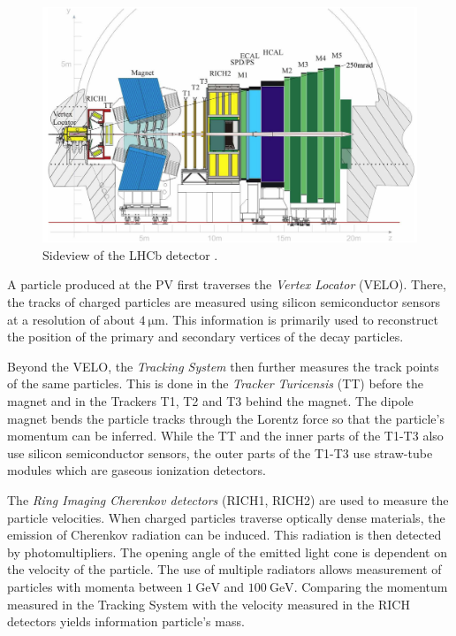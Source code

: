 \begin{figure}
    \centering
    \includegraphics[width=\textwidth]{images/lhcb_detector.png}
    \caption{Sideview of the LHCb detector \cite{LHCb}. }
    \label{fig:lhcb_detector}
\end{figure}

A particle produced at the PV first traverses the \emph{Vertex Locator} (VELO). 
There, the tracks of charged particles are measured using silicon semiconductor sensors at a resolution of about $\qty{4}{\micro\meter}$. 
This information is primarily used to reconstruct the position of the primary and secondary vertices of the decay particles.

Beyond the VELO, the \emph{Tracking System} then further measures the track points of the same particles. 
This is done in the \emph{Tracker Turicensis} (TT) before the magnet and in the Trackers T1, T2 and T3 behind the magnet.
The dipole magnet bends the particle tracks through the Lorentz force so that the particle's momentum can be inferred.
While the TT and the inner parts of the T1-T3 also use silicon semiconductor sensors, the outer parts of the T1-T3 use straw-tube modules which are gaseous ionization detectors. 

The \emph{Ring Imaging Cherenkov detectors} (RICH1, RICH2) are used to measure the particle velocities.
When charged particles traverse optically dense materials, the emission of Cherenkov radiation can be induced.
This radiation is then detected by photomultipliers. 
The opening angle of the emitted light cone is dependent on the velocity of the particle. 
The use of multiple radiators allows measurement of particles with momenta between $\qty{1}{\GeV}$ and $\qty{100}{\GeV}$.
Comparing the momentum measured in the Tracking System with the velocity measured in the RICH detectors yields information particle's mass. 

